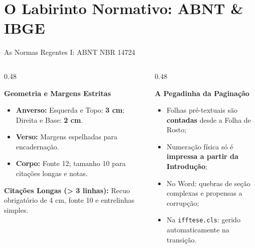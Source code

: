 \documentclass[aspectratio=169, 10pt]{beamer}
\begin{document}
\section{O Labirinto Normativo: ABNT \& IBGE}

\begin{frame}{As Normas Regentes I: ABNT NBR 14724}
  \begin{columns}[T]
    \begin{column}{0.48\textwidth}
      \begin{block}{\textbf{Geometria e Margens Estritas}}
        \scriptsize
        \begin{itemize}\setlength{\itemsep}{1.5pt}
          \item \textbf{Anverso:} Esquerda e Topo: \textbf{3 cm}; Direita e Base: \textbf{2 cm}.
          \item \textbf{Verso:} Margens espelhadas para encadernação.
          \item \textbf{Corpo:} Fonte 12; tamanho 10 para citações longas e notas.
        \end{itemize}
      \end{block}
      \vspace{0.08cm}
      \begin{tcolorbox}[colback=iffblockbg,colframe=gray!50,arc=1.5mm]
        \tiny \textbf{Citações Longas (> 3 linhas):} Recuo obrigatório de 4 cm, fonte 10 e entrelinhas simples.
      \end{tcolorbox}
    \end{column}

    \begin{column}{0.48\textwidth}
      \begin{alertblock}{\textbf{A Pegadinha da Paginação}}
        \scriptsize
        \begin{itemize}\setlength{\itemsep}{1.5pt}
          \item Folhas pré-textuais são \textbf{contadas} desde a Folha de Rosto;
          \item Numeração física só é \textbf{impressa a partir da Introdução};
          \item No Word: quebras de seção complexas e propensas a corrupção;
          \item Na \texttt{ifftese.cls}: gerido automaticamente na transição.
        \end{itemize}
      \end{alertblock}
    \end{column}
  \end{columns}
\end{frame}
\end{document}
